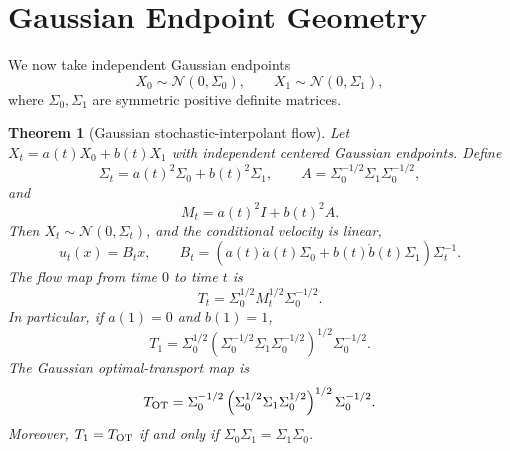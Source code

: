 \documentclass[11pt]{article}
\newtheorem{theorem}{Theorem}
\begin{document}
\section{Gaussian Endpoint Geometry}

We now take independent Gaussian endpoints
\[
        X_0\sim\mathcal N(0,\Sigma_0),\qquad
        X_1\sim\mathcal N(0,\Sigma_1),
\]
where \(\Sigma_0,\Sigma_1\) are symmetric positive definite matrices.

\begin{theorem}[Gaussian stochastic-interpolant flow]
\label{thm:gaussian-flow}
Let \(X_t=a(t)X_0+b(t)X_1\) with independent centered Gaussian endpoints.
Define
\[
        \Sigma_t=a(t)^2\Sigma_0+b(t)^2\Sigma_1,\qquad
        A=\Sigma_0^{-1/2}\Sigma_1\Sigma_0^{-1/2},
\]
and
\[
        M_t=a(t)^2I+b(t)^2A .
\]
Then \(X_t\sim\mathcal N(0,\Sigma_t)\), and the conditional velocity is linear,
\begin{equation}
        u_t(x)=B_tx,\qquad
        B_t=(a(t)\dot a(t)\Sigma_0+b(t)\dot b(t)\Sigma_1)\Sigma_t^{-1}.
        \label{eq:gaussian-velocity}
\end{equation}
The flow map from time \(0\) to time \(t\) is
\begin{equation}
        T_t=\Sigma_0^{1/2}M_t^{1/2}\Sigma_0^{-1/2}.
        \label{eq:gaussian-map}
\end{equation}
In particular, if \(a(1)=0\) and \(b(1)=1\),
\begin{equation}
        T_1=\Sigma_0^{1/2}
        \left(\Sigma_0^{-1/2}\Sigma_1\Sigma_0^{-1/2}\right)^{1/2}
        \Sigma_0^{-1/2}.
        \label{eq:terminal-si-map}
\end{equation}
The Gaussian optimal-transport map is
\begin{equation}
        T_{\rm OT}=
        \Sigma_0^{-1/2}
        \left(\Sigma_0^{1/2}\Sigma_1\Sigma_0^{1/2}\right)^{1/2}
        \Sigma_0^{-1/2}.
        \label{eq:gaussian-ot-map}
\end{equation}
Moreover, \(T_1=T_{\rm OT}\) if and only if
\(\Sigma_0\Sigma_1=\Sigma_1\Sigma_0\).
\end{theorem}
\end{document}
